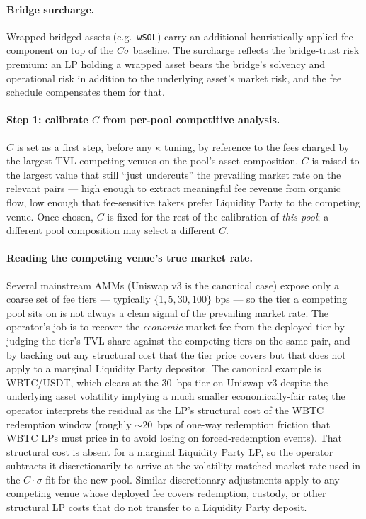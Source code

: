 \documentclass[11pt]{article}
\begin{document}
\paragraph{Bridge surcharge.}
Wrapped-bridged assets (e.g.\ \texttt{wSOL}) carry an additional
heuristically-applied fee component on top of the $C\sigma$ baseline. The
surcharge reflects the bridge-trust risk premium: an LP holding a wrapped
asset bears the bridge's solvency and operational risk in addition to the
underlying asset's market risk, and the fee schedule compensates them for
that.

\paragraph{Step 1: calibrate $C$ from per-pool competitive analysis.}
$C$ is set as a first step, before any $\kappa$ tuning, by reference to
the fees charged by the largest-TVL competing venues on the pool's asset
composition. $C$ is raised to the largest value that still ``just
undercuts'' the prevailing market rate on the relevant pairs --- high
enough to extract meaningful fee revenue from organic flow, low enough
that fee-sensitive takers prefer Liquidity Party to the competing venue.
Once chosen, $C$ is fixed for the rest of the calibration of \emph{this
pool}; a different pool composition may select a different $C$.

\paragraph{Reading the competing venue's true market rate.}
Several mainstream AMMs (Uniswap v3 is the canonical case) expose only a
coarse set of fee tiers --- typically $\{1, 5, 30, 100\}$ bps --- so the
tier a competing pool sits on is not always a clean signal of the
prevailing market rate. The operator's job is to recover the
\emph{economic} market fee from the deployed tier by judging the tier's
TVL share against the competing tiers on the same pair, and by backing
out any structural cost that the tier price covers but that does not
apply to a marginal Liquidity Party depositor. The canonical example is
WBTC/USDT, which clears at the 30~bps tier on Uniswap v3 despite the
underlying asset volatility implying a much smaller economically-fair
rate; the operator interprets the residual as the LP's structural cost
of the WBTC redemption window (roughly $\sim 20$~bps of one-way
redemption friction that WBTC LPs must price in to avoid losing on
forced-redemption events). That structural cost is absent for a marginal
Liquidity Party LP, so the operator subtracts it discretionarily to
arrive at the volatility-matched market rate used in the $C\cdot\sigma$
fit for the new pool. Similar discretionary adjustments apply to any
competing venue whose deployed fee covers redemption, custody, or other
structural LP costs that do not transfer to a Liquidity Party deposit.
\end{document}
